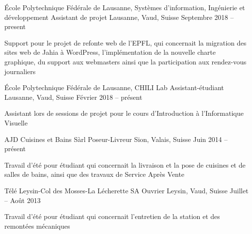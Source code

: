 
\begin{cventries}

	\cventry
	{École Polytechnique Fédérale de Lausanne, Systèmes d'information, Ingénierie et développement}
	{Assistant de projet}
	{Lausanne, Vaud, Suisse}
	{Septembre 2018 -- present}
	{\begin{cvitems}
			\item{Support pour le projet de refonte web de l'EPFL, qui concernait la migration des sites web de Jahia à WordPress, l'implémentation de la nouvelle charte graphique, du support aux webmasters ainsi que la participation aux rendez-vous journaliers}
		\end{cvitems}}

	\cventry
	{École Polytechnique Fédérale de Lausanne, CHILI Lab}
	{Assistant-étudiant}
	{Lausanne, Vaud, Suisse}
	{Février 2018 -- présent}
	{\begin{cvitems}
			\item{Assistant lors de sessions de projet pour le cours d'Introduction à l'Informatique Visuelle}
		\end{cvitems}}

	\cventry
	{AJD Cuisines et Bains Sàrl}
	{Poseur-Livreur}
	{Sion, Valais, Suisse}
	{Juin 2014 -- présent}
	{\begin{cvitems}
			\item{Travail d'été pour étudiant qui concernait la livraison et la pose de cuisines et de salles de bains, ainsi que des travaux de Service Après Vente}
		\end{cvitems}}

	\cventry
	{Télé Leysin-Col des Mosses-La Lécherette SA}
	{Ouvrier}
	{Leysin, Vaud, Suisse}
	{Juillet -- Août 2013}
	{\begin{cvitems}
			\item{Travail d'été pour étudiant qui concernait l'entretien de la station et des remontées mécaniques}
		\end{cvitems}}


\end{cventries}
